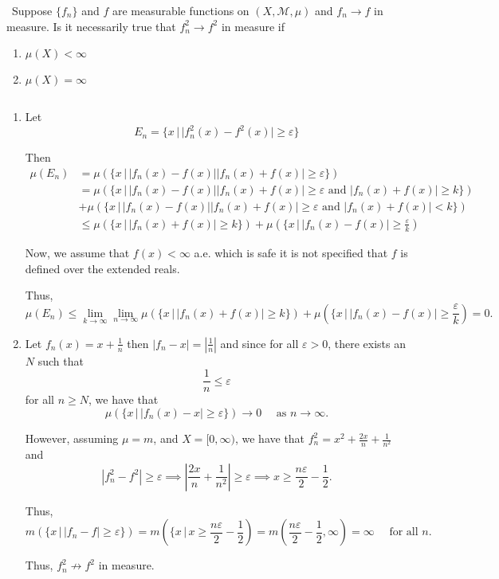 \documentclass[12pt]{Homework}
\begin{document}
\begin{problem} $\,$
Suppose $\{f_n\}$ and $f$ are measurable functions on $(X,\mathscr{M},\mu)$ and $f_n\to f$ in measure. Is it necessarily true that $f_n^2\to f^2$ in measure if 
\begin{enumerate}[label=(\alph*)]
    \item $\mu(X)<\infty$
    \item $\mu(X)=\infty$
\end{enumerate}
\end{problem}


\begin{solution}$\,$
\begin{enumerate}[label=(\alph*)]
    \item Let $$E_n=\{x\,|\,|f_n^2(x)-f^2(x)|\ge\varepsilon\}$$
    
    Then \begin{align*}
        \mu(E_n)&=\mu(\{x\,|\,|f_n(x)-f(x)||f_n(x)+f(x)|\ge\varepsilon\})\\
        &=\mu(\{x\,|\,|f_n(x)-f(x)||f_n(x)+f(x)|\ge\varepsilon\text{ and }|f_n(x)+f(x)|\ge k\})\\
        &+\mu(\{x\,|\,|f_n(x)-f(x)||f_n(x)+f(x)|\ge\varepsilon\text{ and }|f_n(x)+f(x)|<k\})\\
        &\le\mu(\{x\,|\,|f_n(x)+f(x)|\ge k\})+\mu(\{x\,|\,|f_n(x)-f(x)|\ge\frac{\varepsilon}{k})
    \end{align*}
    
    Now, we assume that $f(x)<\infty$ a.e. which is safe it is not specified that $f$ is defined over the extended reals.
    
    Thus, $$\mu(E_n)\le\lim_{k\to\infty}\lim_{n\to\infty}\mu(\{x\,|\,|f_n(x)+f(x)|\ge k\})+\mu(\{x\,|\,|f_n(x)-f(x)|\ge\frac{\varepsilon}{k})=0.$$
    \item Let $f_n(x)=x+\frac{1}{n}$ then $|f_n-x|=|\frac{1}{n}|$ and since for all $\varepsilon>0$, there exists an $N$ such that $$\frac{1}{n}\le\varepsilon$$ for all $n\ge N$, we have that $$\mu(\{x\,|\,|f_n(x)-x|\ge\varepsilon\})\to0\quad\text{ as }n\to\infty.$$
    
    However, assuming $\mu=m$, and $X=[0,\infty)$, we have that $f_n^2=x^2+\frac{2x}{n}+\frac{1}{n^2}$ and $$|f_n^2-f^2|\ge\varepsilon\implies \left|\frac{2x}{n}+\frac{1}{n^2}\right|\ge\varepsilon\implies x\ge\frac{n\varepsilon}{2}-\frac{1}{2}.$$
    
    Thus,
     $$m(\{x\,|\,|f_n-f|\ge\varepsilon\})=m\left(\{x\,|\,x\ge\frac{n\varepsilon}{2}-\frac{1}{2}\right)=m\left(\frac{n\varepsilon}{2}-\frac{1}{2},\infty\right)=\infty\quad\text{ for all }n.$$
     
     Thus, $f_n^2\not\to f^2$ in measure.
\end{enumerate}
\end{solution}
\newpage
\end{document}
